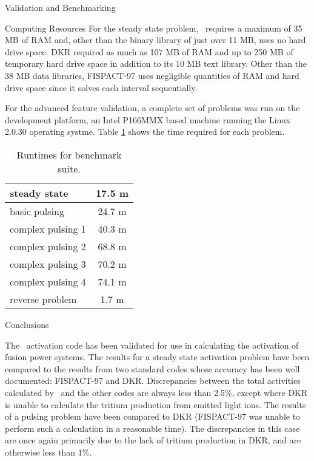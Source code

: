 \begin{chapter}{Validation and Benchmarking}
\begin{section}{Computing Resources}
    For the steady state problem, \ALARA\ requires a maximum of 35 MB
    of RAM and, other than the binary library of just over 11 MB, uses
    no hard drive space.  DKR required as much as 107 MB of RAM and up
    to 250 MB of temporary hard drive space in addition to its 10 MB
    text library.  Other than the 38 MB data libraries, FISPACT-97
    uses negligible quantities of RAM and hard drive space since it
    solves each interval sequentially.
    
    For the advanced feature validation, a complete set of problems
    was run on the development platform, an Intel P166MMX based
    machine running the Linux 2.0.30 operating systme.  Table
    \ref{tab:valid.runtime} shows the time required for each problem.

    \begin{table}[htbp]
      \begin{center}
        \leavevmode
        \begin{tabular}{|l|c|}
          \hline
          steady state & 17.5 m\\\hline
          basic pulsing & 24.7 m\\\hline\hline
          complex pulsing 1 & 40.3 m\\\hline
          complex pulsing 2 & 68.8 m\\\hline
          complex pulsing 3 & 70.2 m\\\hline
          complex pulsing 4 & 74.1 m \\\hline
          reverse problem & 1.7 m\\\hline
        \end{tabular}
        \caption{Runtimes for benchmark suite.}
        \label{tab:valid.runtime}
      \end{center}
    \end{table}
  \end{section}
  
  \begin{section}{Conclusions}
    
    The \ALARA\ activation code has been validated for use in
    calculating the activation of fusion power systems.  The results
    for a steady state activation problem have been compared to the
    results from two standard codes whose accuracy has been well
    documented\cite{IAEA.bench2.rep}: FISPACT-97 and DKR.
    Discrepancies between the total activities calculated by \ALARA\ 
    and the other codes are always less than 2.5\%, except where DKR
    is unable to calculate the tritium production from emitted light
    ions.  The results of a pulsing problem have been compared to DKR
    (FISPACT-97 was unable to perform such a calculation in a
    reasonable time).  The discrepancies in this case are once again
    primarily due to the lack of tritium production in DKR, and are
    otherwise less than 1\%.
    

\end{section}
\end{chapter}
